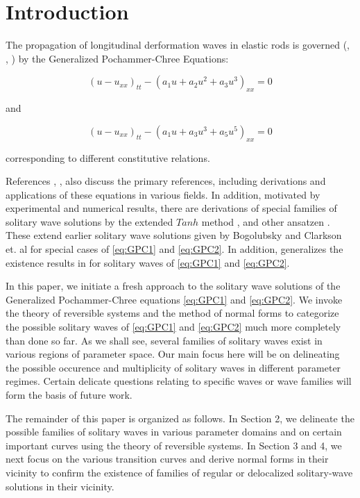 \section{Introduction}

The propagation of longitudinal derformation waves in elastic rods is governed
(\cite{LCZ}, \cite{Runz}, \cite{WM}) by the Generalized Pochammer-Chree
Equations:

\begin{equation}\label{eq:GPC1}
\left( u - u_{xx} \right)_{tt} - \left( a_1 u + a_2 u^2 + a_3 u^3 \right)_{xx} =0  
\end{equation}

and

\begin{equation}  \label{eq:GPC2} 
\left( u - u_{xx} \right)_{tt} - \left( a_1 u + a_3 u^3 + a_5 u^5 \right)_{xx} =0
\end{equation}

corresponding to different constitutive relations.

References \cite{LCZ}, \cite{Runz}, \cite{WM} also discuss the primary
references, including derivations and applications of these equations in
various fields. In addition, motivated by experimental and numerical results,
there are derivations of special families of solitary wave solutions by the
extended $Tanh$ method \cite{LCZ}, and other ansatzen \cite{WM}. These extend
earlier solitary wave solutions given by Bogolubsky \cite{Bogo} and Clarkson
et. al \cite{CLVS} for special cases of \eqref{eq:GPC1} and \eqref{eq:GPC2}. In
addition, \cite{Runz} generalizes the existence results in \cite{Sax} for
solitary waves of \eqref{eq:GPC1} and \eqref{eq:GPC2}.  

In this paper, we initiate a fresh approach to the solitary wave solutions of
the Generalized Pochammer-Chree equations \eqref{eq:GPC1} and \eqref{eq:GPC2}.
We invoke the theory of reversible systems and the method of normal forms to
categorize the possible solitary waves of \eqref{eq:GPC1} and \eqref{eq:GPC2}
much more completely than done so far.  As we shall see, several families of
solitary waves exist in various regions of parameter space. Our main focus here
will be on delineating the possible occurence and multiplicity of solitary
waves in different parameter regimes. Certain delicate questions relating to
specific waves or wave families will form the basis of future work. 

The remainder of this paper is organized as follows. In Section 2, we delineate
the possible families of solitary waves in various parameter domains and on
certain important curves using the theory of reversible systems. In Section 3
and 4, we next focus on the various transition curves and derive normal forms
in their vicinity to confirm the existence of families of regular or
delocalized solitary-wave solutions in their vicinity.

